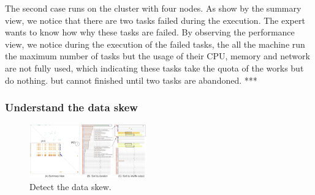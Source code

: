 The second case runs on the cluster with four nodes. As show by the summary view,  we notice that there are two tasks failed during the execution. The expert wants to know how why these tasks are failed. By observing the performance view, we notice during the execution of the failed tasks, the all the machine run the maximum number of tasks but the usage of their CPU, memory and network are not fully used, which indicating these tasks take the quota of the works but do nothing. but cannot finished until two tasks are abandoned.
***

\subsubsection{Understand the data skew}

\begin{figure}[t]
	\centering
	\includegraphics[width=0.45\textwidth]{figures/case_study/CaseStudy3.pdf}
	\vspace{-3mm}
	\caption{Detect the data skew.}
	\label{fig:casestudy3}
	\vspace{-3mm}
\end{figure}
